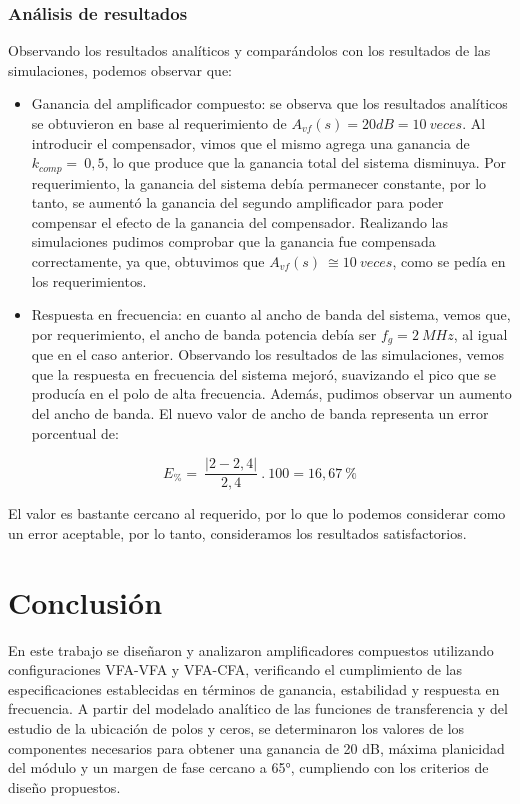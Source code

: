 \documentclass[12pt,a4paper]{article}
\begin{document}
\subsubsection{Análisis de
resultados}\label{anuxe1lisis-de-resultados-2}

Observando los resultados analíticos y comparándolos con los resultados
de las simulaciones, podemos observar que:

\begin{itemize}
\item
  Ganancia del amplificador compuesto: se observa que los resultados
  analíticos se obtuvieron en base al requerimiento de
  \(A_{vf}(s) = 20dB = 10\ veces\). Al introducir el compensador, vimos
  que el mismo agrega una ganancia de \(k_{comp} = \ 0,5\), lo que
  produce que la ganancia total del sistema disminuya. Por
  requerimiento, la ganancia del sistema debía permanecer constante, por
  lo tanto, se aumentó la ganancia del segundo amplificador para poder
  compensar el efecto de la ganancia del compensador. Realizando las
  simulaciones pudimos comprobar que la ganancia fue compensada
  correctamente, ya que, obtuvimos que \(A_{vf}(s)\  \cong 10\ veces\),
  como se pedía en los requerimientos.
\item
  Respuesta en frecuencia: en cuanto al ancho de banda del sistema,
  vemos que, por requerimiento, el ancho de banda potencia debía ser
  \(f_{g} = 2\ MHz\), al igual que en el caso anterior. Observando los
  resultados de las simulaciones, vemos que la respuesta en frecuencia
  del sistema mejoró, suavizando el pico que se producía en el polo de
  alta frecuencia. Además, pudimos observar un aumento del ancho de
  banda. El nuevo valor de ancho de banda representa un error porcentual
  de:
\end{itemize}

\[E_{\%} = \ \frac{|2 - 2,4|}{2,4}\ .\ 100 = 16,67\ \%\]

El valor es bastante cercano al requerido, por lo que lo podemos
considerar como un error aceptable, por lo tanto, consideramos los
resultados satisfactorios.

\newpage

\section{Conclusión}\label{conclusiuxf3n}

En este trabajo se diseñaron y analizaron amplificadores compuestos utilizando configuraciones VFA-VFA y VFA-CFA, verificando el cumplimiento de las especificaciones establecidas en términos de ganancia, estabilidad y respuesta en frecuencia. A partir del modelado analítico de las funciones de transferencia y del estudio de la ubicación de polos y ceros, se determinaron los valores de los componentes necesarios para obtener una ganancia de 20 dB, máxima planicidad del módulo y un margen de fase cercano a 65°, cumpliendo con los criterios de diseño propuestos. 
\end{document}
